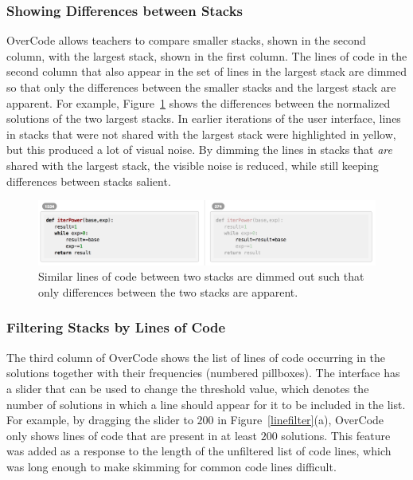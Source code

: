 \subsubsection{Showing Differences between Stacks} OverCode allows teachers to compare smaller stacks, shown in the second column, with the largest stack, shown in the first column. The lines of code in the second column that also appear in the set of lines in the largest stack are dimmed so that only the differences between the smaller stacks and the largest stack are apparent. For example, Figure~\ref{stackdifferences} shows the differences between the normalized solutions of the two largest stacks. In earlier iterations of the user interface, lines in stacks that were not shared with the largest stack were highlighted in yellow, but this produced a lot of visual noise. By dimming the lines in stacks that \textit{are} shared with the largest stack, the visible noise is reduced, while still keeping differences between stacks salient.

\begin{figure}
\centering
\includegraphics[scale=0.42]{Body/figures/overcode/lineFadingScreenshot}
\caption{Similar lines of code between two stacks are dimmed out such that only differences between the two stacks are apparent.}
\label{stackdifferences}
\end{figure}



\subsubsection{Filtering Stacks by Lines of Code} The third column of OverCode shows the list of lines of code occurring in the solutions together with their frequencies (numbered pillboxes). The interface has a slider that can be used to change the threshold value, which denotes the number of solutions in which a line should appear for it to be included in the list. For example, by dragging the slider to $200$ in Figure~\ref{linefilter}(a), OverCode only shows lines of code that are present in at least $200$ solutions. This feature was added as a response to the length of the unfiltered list of code lines, which was long enough to make skimming for common code lines difficult.

